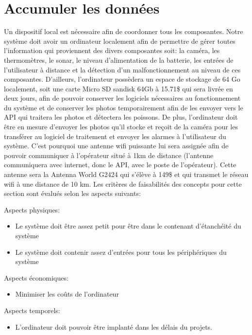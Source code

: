 

\section{Accumuler les données}
\label{s:faisab_accumuler}

Un dispositif local est nécessaire afin de coordonner tous les composantes. Notre système doit avoir un ordinateur localement afin de permettre de gérer toutes l’information qui proviennent des divers composantes soit: la caméra, les thermomètres, le sonar, le niveau d’alimentation de la batterie, les entrées de l’utilisateur à distance et la détection d’un malfonctionnement au niveau de ces composantes. D’ailleurs, l’ordinateur possèdera un espace de stockage de 64 Go localement, soit une carte Micro SD sandisk 64Gb à 15.71\$ qui sera livrée en deux jours, afin de pouvoir conserver les logiciels nécessaires au fonctionnement du système et de conserver les photos temporairement afin de les envoyer vers le API qui traitera les photos et détectera les poissons. De plus, l’ordinateur doit être en mesure d’envoyer les photos qu’il stocke et reçoit de la caméra pour les transférer au logiciel de traitement et envoyer les alarmes à l’utilisateur du système. C’est pourquoi une antenne wifi puissante lui sera assignée afin de pouvoir communiquer à l’opérateur situé à 1km de distance (l’antenne communiquera avec internet, donc le API, avec le poste de l’opérateur). Cette antenne sera la Antenna World G2424 qui s’élève à 149\$ et qui transmet le réseau wifi à une distance de 10 km. Les critères de faisabilités des concepts pour cette section sont évalués selon les aspects suivants:

Aspects physiques:
\begin{itemize}
	\item Le système doit être assez petit pour être dans le contenant d’étanchéité du système
	\item Le système doit contenir assez d’entrées pour tous les périphériques du système
\end{itemize}

Aspects économiques:
\begin{itemize}
	\item Minimiser les coûts de l’ordinateur
\end{itemize}

Aspects temporels:
\begin{itemize}
	\item L’ordinateur doit pouvoir être implanté dans les délais du projets.
\end{itemize}

